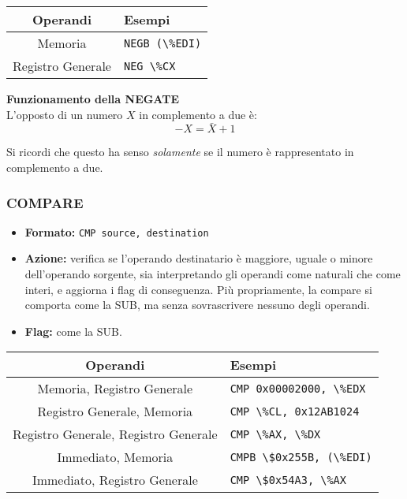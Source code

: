 \documentclass[a4paper,11pt]{article}
\begin{document}
		\begin{table}[H]
		\center {}
			\begin{tabular} { c | p{5cm} }
				\bfseries Operandi & \bfseries Esempi \\
				\hline
				Memoria & \lstinline|NEGB (\%EDI)| \\ 
				Registro Generale & \lstinline|NEG \%CX|
			\end{tabular}
		\end{table}


\par\medskip
\noindent
\textbf{\textsf{Funzionamento della NEGATE}} \\
L'opposto di un numero $X$ in complemento a due è:
$$
-X = \bar{X} + 1
$$

Si ricordi che questo ha senso \textit{solamente} se il numero è rappresentato in complemento a due.

\subsubsection{COMPARE}
\begin{itemize}
	\item \textbf{Formato:} \lstinline|CMP source, destination|
	\item \textbf{Azione:} verifica se l'operando destinatario è maggiore, uguale o minore dell'operando sorgente, sia interpretando gli operandi come naturali che come interi, e aggiorna i flag di conseguenza.
		Più propriamente, la compare si comporta come la SUB, ma senza sovrascrivere nessuno degli operandi.
	\item \textbf{Flag:} come la SUB. 
\end{itemize}


		\begin{table}[H]
		\center {}
			\begin{tabular} { c | p{5cm} }
				\bfseries Operandi & \bfseries Esempi \\
				\hline
				Memoria, Registro Generale & \lstinline|CMP 0x00002000, \%EDX| \\ 
				Registro Generale, Memoria & \lstinline|CMP \%CL, 0x12AB1024| \\ 
				Registro Generale, Registro Generale & \lstinline|CMP \%AX, \%DX| \\ 
				Immediato, Memoria & \lstinline|CMPB \$0x255B, (\%EDI)| \\ 
				Immediato, Registro Generale & \lstinline|CMP \$0x54A3, \%AX|
			\end{tabular}
		\end{table}
\end{document}
